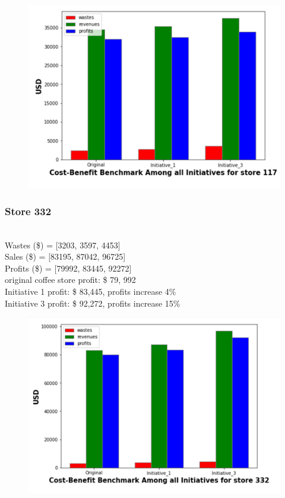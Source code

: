 \begin{figure}[ht]
    \centering
    \includegraphics[width = 0.7\linewidth]{figures/section2.png}
\end{figure}

\subsubsection{Store 332}  \\
Wastes (\$) = [3203, 3597, 4453] \\
Sales (\$) = [83195, 87042, 96725] \\
Profits (\$) = [79992, 83445, 92272]\\
original coffee store profit: \$ 79, 992 \\
Initiative 1 profit: \$ 83,445, profits increase 4\%\\
Initiative 3 profit: \$ 92,272, profits increase 15\%\\

\begin{figure}[ht]
    \centering
    \includegraphics[width = 0.7\linewidth]{figures/section3.png}
\end{figure}


